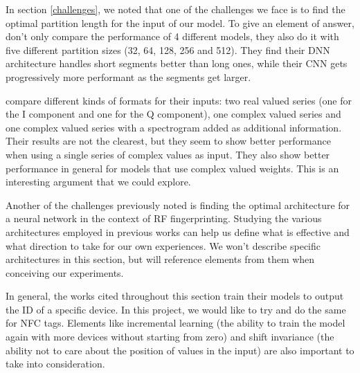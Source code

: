 In section \ref{challenges}, we noted that one of the challenges we face is to find the optimal partition length for the input of our model. To give an element of answer, \textcite{youssef_machine_2017} don't only compare the performance of 4 different models, they also do it with five different partition sizes (32, 64, 128, 256 and 512). They find their DNN architecture handles short segments better than long ones, while their CNN gets progressively more performant as the segments get larger.

\textcite{stankowicz_complex_2019} compare different kinds of formats for their inputs: two real valued series (one for the I component and one for the Q component), one complex valued series and one complex valued series with a spectrogram added as additional information. Their results are not the clearest, but they seem to show better performance when using a single series of complex values as input. They also show better performance in general for models that use complex valued weights. This is an interesting argument that we could explore.

Another of the challenges previously noted is finding the optimal architecture for a neural network in the context of RF fingerprinting. Studying the various architectures employed in previous works can help us define what is effective and what direction to take for our own experiences. We won't describe specific architectures in this section, but will reference elements from them when conceiving our experiments.

In general, the works cited throughout this section train their models to output the ID of a specific device. In this project, we would like to try and do the same for NFC tags. Elements like incremental learning (the ability to train the model again with more devices without starting from zero) and shift invariance (the ability not to care about the position of values in the input) are also important to take into consideration.
